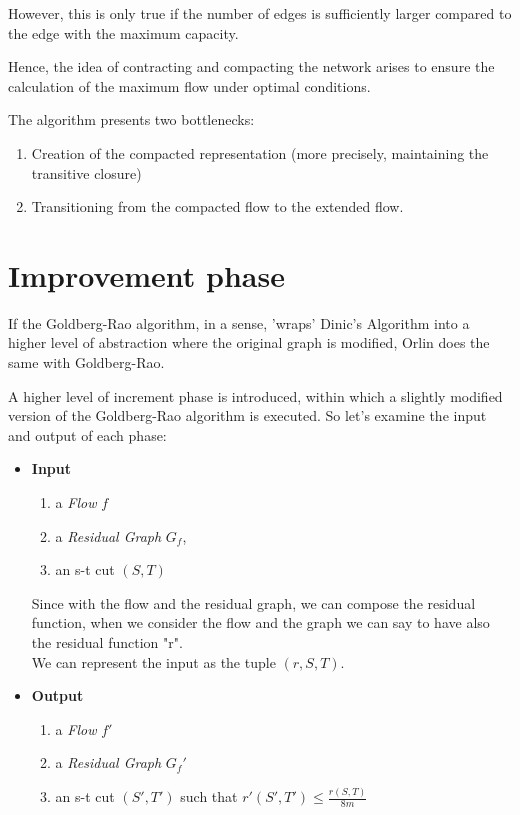     However, this is only true if the number of edges is sufficiently larger compared to the edge with the maximum capacity.  
    
    Hence, the idea of contracting and compacting the network arises to ensure the calculation of the maximum flow under optimal conditions.

    The algorithm presents two bottlenecks:
    \begin{enumerate}
        \item Creation of the compacted representation (more precisely, maintaining the transitive closure)
        \item Transitioning from the compacted flow to the extended flow.
    \end{enumerate}

\section{Improvement phase}
If the Goldberg-Rao algorithm, in a sense, 'wraps' Dinic's Algorithm into a higher level of abstraction where the original graph is modified, Orlin does the same with Goldberg-Rao.

A higher level of increment phase is introduced, within which a slightly modified version of the Goldberg-Rao algorithm is executed.
So let's examine the input and output of each phase:

\begin{itemize}[itemsep=0.5ex]
    \item \textbf{Input}
    \begin{enumerate}
        \item a \textit{Flow} \(f\)
        \item a \textit{Residual Graph} \(G_f\), 
        \item an s-t cut \((S,T)\)
    \end{enumerate}
    Since with the flow and the residual graph, we can compose the residual function, when we consider the flow and the graph we can say to have also the residual function "r". \\
    We can represent the input as the tuple \((r, S, T)\).
    
    \item \textbf{Output}
    \begin{enumerate}
        \item a \textit{Flow} \(f'\)
        \item a \textit{Residual Graph} \(G_f'\)
        \item an s-t cut \((S', T')\) such that \(r'(S', T') \leq \frac{r(S, T)}{8m}\)
    \end{enumerate}
\end{itemize}

